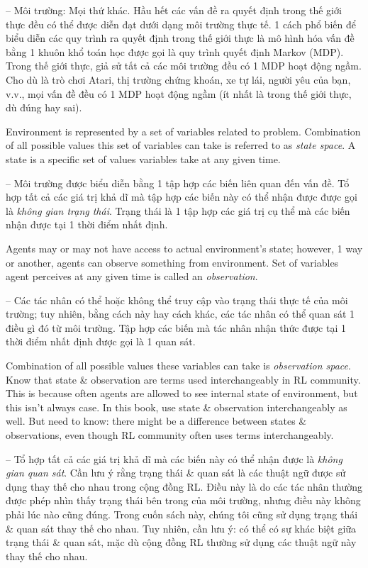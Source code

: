 \documentclass{article}
\begin{document}
\begin{itemize}
\begin{itemize}
\begin{itemize}
            -- {\sf Môi trường: Mọi thứ khác.} Hầu hết các vấn đề ra quyết định trong thế giới thực đều có thể được diễn đạt dưới dạng môi trường thực tế. 1 cách phổ biến để biểu diễn các quy trình ra quyết định trong thế giới thực là mô hình hóa vấn đề bằng 1 khuôn khổ toán học được gọi là quy trình quyết định Markov (MDP). Trong thế giới thực, giả sử tất cả các môi trường đều có 1 MDP hoạt động ngầm. Cho dù là trò chơi Atari, thị trường chứng khoán, xe tự lái, người yêu của bạn, v.v., mọi vấn đề đều có 1 MDP hoạt động ngầm (ít nhất là trong thế giới thực, dù đúng hay sai).

            Environment is represented by a set of variables related to problem. Combination of all possible values this set of variables can take is referred to as {\it state space}. A state is a specific set of values variables take at any given time.

            -- Môi trường được biểu diễn bằng 1 tập hợp các biến liên quan đến vấn đề. Tổ hợp tất cả các giá trị khả dĩ mà tập hợp các biến này có thể nhận được được gọi là {\it không gian trạng thái}. Trạng thái là 1 tập hợp các giá trị cụ thể mà các biến nhận được tại 1 thời điểm nhất định.

            Agents may or may not have access to actual environment's state; however, 1 way or another, agents can observe something from environment. Set of variables agent perceives at any given time is called an {\it observation}.

            -- Các tác nhân có thể hoặc không thể truy cập vào trạng thái thực tế của môi trường; tuy nhiên, bằng cách này hay cách khác, các tác nhân có thể quan sát 1 điều gì đó từ môi trường. Tập hợp các biến mà tác nhân nhận thức được tại 1 thời điểm nhất định được gọi là 1 quan sát.

            Combination of all possible values these variables can take is {\it observation space}. Know that state \& observation are terms used interchangeably in RL community. This is because often agents are allowed to see internal state of environment, but this isn't always case. In this book, use state \& observation interchangeably as well. But need to know: there might be a difference between states \& observations, even though RL community often uses terms interchangeably.

            -- Tổ hợp tất cả các giá trị khả dĩ mà các biến này có thể nhận được là {\it không gian quan sát}. Cần lưu ý rằng trạng thái \& quan sát là các thuật ngữ được sử dụng thay thế cho nhau trong cộng đồng RL. Điều này là do các tác nhân thường được phép nhìn thấy trạng thái bên trong của môi trường, nhưng điều này không phải lúc nào cũng đúng. Trong cuốn sách này, chúng tôi cũng sử dụng trạng thái \& quan sát thay thế cho nhau. Tuy nhiên, cần lưu ý: có thể có sự khác biệt giữa trạng thái \& quan sát, mặc dù cộng đồng RL thường sử dụng các thuật ngữ này thay thế cho nhau.
        \end{itemize}



\end{itemize}
\end{itemize}
\end{document}
